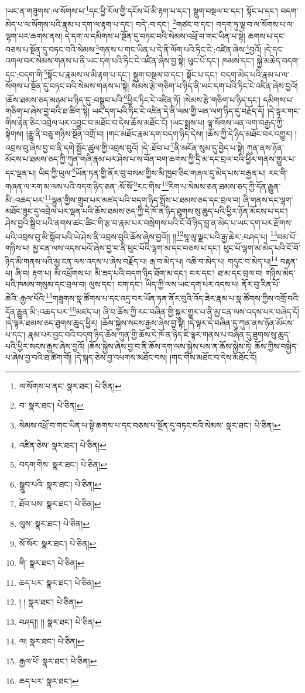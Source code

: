།ཡང་ན་གཟུགས་:ལ་སོགས་པ་\footnote{ལ་སོགས་པ་ནང་  སྣར་ཐང་།  པེ་ཅིན། }དང་ཕྱི་རོལ་གྱི་དངོས་པོ་མི་རྟག་པ་དང་། སྡུག་བསྔལ་བ་དང་། སྟོང་པ་དང་། བདག་མེད་པ་ལ་སོགས་པའི་རྣམ་པ་དག་ལ་རྟག་པ་དང་། བདེ་:བ་དང་། \footnote{བ་  སྣར་ཐང་།  པེ་ཅིན། }གཙང་བ་དང་། བདག་ཏུ་ལྟ་བ་ལ་སོགས་པ་ལ་ལྷག་པར་ཆགས་ནས། དེ་དག་ལ་དམིགས་པ་སྔོན་དུ་བཏང་བའི་སེམས་འཕྲོ་བ་གང་ཡིན་པ་སྟེ། ཆགས་པ་དང་བཅས་པ་སྔོན་དུ་བཏང་བའི་སེམས་\footnote{སེམས་འཕྲོ་བ་གང་ཡིན་པ་སྟེ་ཆགས་པ་དང་བཅས་པ་སྔོན་དུ་བཏང་བའི་སེམས་  སྣར་ཐང་།  པེ་ཅིན། }གནས་པ་གང་ཡིན་པ་དེ་ནི་ལོག་པའི་ཏིང་ངེ་:འཛིན་ཞེས་\footnote{འཛིན་ཅེས་  སྣར་ཐང་།  པེ་ཅིན། }བྱའོ། །དེ་དང་འགལ་བར་སེམས་གནས་པ་ནི་ཡང་དག་པའི་ཏིང་ངེ་འཛིན་ཞེས་བྱ་སྟེ། ཕུང་པོ་དང་། ཁམས་དང་། སྐྱེ་མཆེད་བདག་དང་:བདག་གི་\footnote{བདག་གིས་  སྣར་ཐང་།  པེ་ཅིན། }སྟོང་པ་རྣམས་ལ་མི་རྟག་པ་དང་། སྡུག་བསྔལ་བ་དང་། སྟོང་པ་དང་། བདག་མེད་པའི་རྣམ་པ་ལ་སོགས་པ་སྔོན་དུ་བཏང་བའི་སེམས་གནས་པ་སྟེ། སེམས་རྩེ་གཅིག་པ་ཉིད་ནི་ཡང་དག་པའི་ཏིང་ངེ་འཛིན་ཞེས་བྱའོ། །ཆོས་ཐམས་ཅད་མཉམ་པ་ཉིད་དུ་:བསྒྲུབ་པའི་\footnote{སྒྲུབ་པའི་  སྣར་ཐང་།  པེ་ཅིན། }ཕྱིར་ཏིང་ངེ་འཛིན་ཏོ། །སེམས་རྩེ་གཅིག་པ་ཉིད་དང་། དམིགས་པ་གཅིག་པ་ཞེས་བྱ་བའི་ཐ་ཚིག་སྟེ། ཡང་དག་པའི་ཏིང་ངེ་འཛིན་དེ་ནི་ལམ་གྱི་ཡན་ལག་ཉིད་དུ་བརྗོད་དོ། །དེ་ལྟར་གང་གིས་རྟེན་ཅིང་འབྲེལ་པར་འབྱུང་བ་མཐོང་བ་དེས་ཆོས་མཐོང་ངོ། །ཡང་སྨྲས་པ། ལྟ་སོགས་ཡན་ལག་བརྒྱད་ཀྱི་སྟེགས། །རྒྱུ་ནི་བཅུ་གཉིས་སྔོན་འགྲོ་བ། །གང་མཐོང་རྣམ་དག་བདག་ཉིད་དེས། །ཆོས་ཀྱི་དེ་ཉིད་མཐོང་བར་འགྱུར། །འབྲས་བུ་ཞེས་བྱ་བ་ནི་དགེ་སྦྱོང་ཚུལ་གྱི་འབྲས་བུའོ། །དེ་:ཐོབ་པ་\footnote{ཐོབ་པས་  སྣར་ཐང་།  པེ་ཅིན། }ནི་མངོན་སུམ་དུ་བྱེད་པ་སྟེ། ཀུན་ནས་ཉོན་མོངས་པ་ཐམས་ཅད་ཀྱི་ཀུན་གཞི་རྣམ་པར་ཤེས་པ་ས་བོན་བག་ཆགས་ཀྱི་དྲི་མ་དང་བྲལ་བའི་ཕྱིར་གནས་གྱུར་པ་དང་ལྡན་པ། ཡིད་ཀྱི་ཡུལ་\footnote{ལུས་  སྣར་ཐང་།  པེ་ཅིན། }ཡོན་ཏན་གྱི་ནོར་བུ་བསམ་གྱིས་མི་ཁྱབ་ཅིང་གཞལ་དུ་མེད་པས་བརྒྱན་པ། རང་གི་གཞན་ལ་རག་མ་ལས་པའི་བདག་ཉིད་ཅན་:སོ་སོ་\footnote{སོ་སོར་  སྣར་ཐང་།  པེ་ཅིན། }རང་གིས་\footnote{གི་  སྣར་ཐང་།  པེ་ཅིན། }རིག་པ་སེམས་ཅན་ཐམས་ཅད་ཀྱི་དོན་རྒྱུན་མི་:འཆད་པར་\footnote{ཆད་པར་  སྣར་ཐང་།  པེ་ཅིན། }ལྷུན་གྱིས་གྲུབ་པར་མཛད་པའི་བདག་ཉིད་སྤྲོས་པ་ཐམས་ཅད་དང་བྲལ་བ། ཞི་གནས་དང་ལྷག་མཐོང་ཟུང་དུ་འབྲེལ་པར་ལྡན་པའི་ཆོས་ཐམས་ཅད་ཀྱི་དེ་ཁོ་ན་ཉིད་ཐུགས་སུ་ཆུད་པའི་ཕྱིར་ཉོན་མོངས་པ་དང་། ཤེས་བྱའི་སྒྲིབ་པའི་ནགས་ཚང་ཚིང་གི་རྩ་བ་རྣམ་པར་བསྲེགས་པའི་ངོ་བོ་ཉིད་བླ་ན་མེད་པ་ཡང་དག་པར་རྫོགས་པའི་འབྲས་བུ་མི་སློབ་པའི་ཡེ་ཤེས་ནི་འབྲས་བུའི་ཆོས་ཞེས་བྱའོ།། །།\footnote{། །  སྣར་ཐང་།  པེ་ཅིན། }སཱ་ལུ་ལྗང་པའི་རྒྱ་ཆེར་:བཤད་པ། \footnote{བཤད།། །།   སྣར་ཐང་།  པེ་ཅིན། }བམ་པོ་གཉིས་པ། མྱ་ངན་ལས་འདས་པའོ་ཞེས་བྱ་བ་ནི་ཕུང་པོའི་ལྷག་མ་དང་བཅས་པ་དང་། ཕུང་པོ་ལྷག་མ་མེད་པའི་ངོ་བོ་ཉིད་མི་གནས་པའི་མྱ་ངན་ལས་འདས་པ་ཞེས་བརྗོད་པ། རྒ་བ་མེད་པ། འཆི་བ་མེད་པ། གདུང་བ་མེད་པ།\footnote{ལ།  སྣར་ཐང་།  པེ་ཅིན། } བརྟན་པ། ཞི་བ། རྟག་པ། མི་འཕྲོགས་པ། མི་ཟད་པའི་བདག་ཉིད་ཐོག་མ་དང་། བར་དང་། ཐ་མ་དང་བྲལ་བ། གཉིས་མེད་པའི་ཁམས་གསུམ་དང་བྲལ་བ། ལུས་དང་། ངག་དང་། ཡིད་ཀྱི་ལས་ཡང་དག་པར་འདས་པ། ནོར་བུ་རིན་པོ་ཆེའི་:རྒྱལ་པོའི་\footnote{རྒྱལ་པོ་  སྣར་ཐང་།  པེ་ཅིན། }གཟུགས་སྣ་ཚོགས་པ་དང་འདྲ་བར་ཡོན་ཏན་ནོར་བུའི་འོད་ཟེར་རྣམ་པ་སྣ་ཚོགས་ཀྱིས་འགྲོ་བའི་དོན་རྒྱུན་མི་:འཆད་པར་\footnote{ཆད་པར་  སྣར་ཐང་། }མཛད་པ། ཞི་བ་ཆོས་ཀྱི་རང་བཞིན་གྱི་སྐུར་གྱུར་པ་ནི་མྱ་ངན་ལས་འདས་པར་བཞེད་དོ། །དེ་ལྟར་ཐམས་ཅད་ཐུགས་ཆུད་ཕྱིར། །ཆོས་སྐྱེས་སངས་རྒྱས་ཞེས་བྱ་སྟེ། །དེ་ལྟར་དེ་བཞིན་དུ་ཀུན་ནས་ཉོན་མོངས་པ་དང་། རྣམ་པར་བྱང་བའི་བདག་ཉིད་ཆོས་ཀུན་གྱི་ཆོས་དེ་ཁོ་ན་ཉིད་ཇི་ལྟར་གནས་པ་བཞིན་དུ་ཐུགས་སུ་ཆུད་པའི་ཕྱིར་སངས་རྒྱས་ཞེས་བྱའོ། །ཆོས་སྐྱེས་ཞེས་བྱ་བ་ནི་ཆོས་དག་ལས་སྐྱེས་པས་ན་ཆོས་སྐྱེས་ཏེ། ཆོས་ཀྱིས་བསྐྱེད་པ་ཞེས་བྱ་བའི་ཐ་ཚིག་གོ། །དེ་སྐད་ཅེས་བྱ་འཕགས་མཐོང་བས། །གང་གིས་མཐོང་བ་དེས་མཐོང་ངོ། 